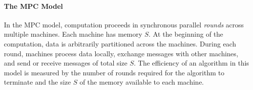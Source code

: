 \paragraph{The MPC Model}
In the MPC model, computation proceeds in synchronous parallel \emph{rounds} across multiple machines. Each machine has memory $S$. At the beginning of the computation, data is arbitrarily partitioned across the machines. During each round, machines process data locally, exchange messages with other machines, and send or receive messages of total size $S$. The efficiency of an algorithm in this model is measured by the number of rounds required for the algorithm to terminate and the size $S$ of the memory available to each machine.

